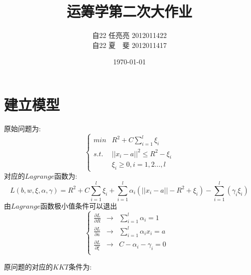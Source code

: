 \documentclass[article,12pt]{article}
\author{自22 任亮亮 2012011422\\自22 夏\ \ 斐 2012011417}
\date{\today}
\title{运筹学第二次大作业}
\begin{document}
\maketitle
\newpage
\renewcommand{\contentsname}{目录}
\tableofcontents
\newpage


\section{建立模型}
原始问题为:
\begin{equation}
 \left\{
    \begin{array}{cc}
    min & R^2+C\sum\limits_{i=1}^l\xi_i\\
    s.t. & ||x_i-a||^2\leq R^2-\xi_i\\
        &  \xi_i\geq 0 ,i=1,2\dots ,l
    \end{array}
    \right.
\end{equation}
对应的$Lagrange$函数为:\tabularnewline
\begin{equation}
L(b,w,\xi,\alpha,\gamma)=R^2+C\sum\limits_{i=1}^l\xi_i+\sum\limits_{i=1}^l\alpha_i(||x_i-a||-R^2+\xi_i)-\sum\limits_{i=1}^l(\gamma_i \xi_i)
\end{equation}
由$Lagrange$函数极小值条件可以退出
\begin{equation}
\left\{
\begin{array}{cccc}
      \frac{\partial L}{ \partial R} & \xrightarrow{} & \sum\limits_{i=1}^l \alpha_i=1&\\
     \frac{\partial L}{ \partial a} & \xrightarrow{} & \sum\limits_{i=1}^l\alpha_i x_i=a  & \\
     \frac{\partial L}{ \partial \xi} & \xrightarrow{} & C-\alpha_i-\gamma_i=0  &  \\
     
     \end{array} 
\right.
\end{equation}

原问题的对应的$KKT$条件为:\tabularnewline
\end{document}
